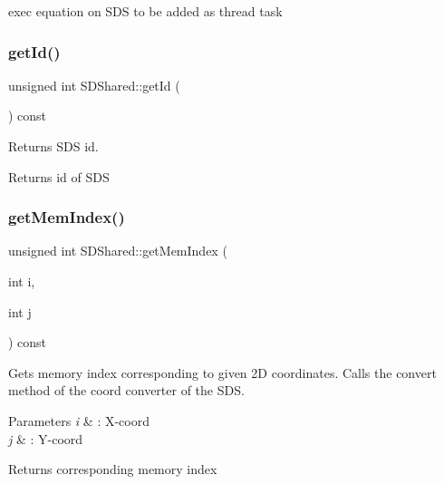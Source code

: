 exec equation on S\+DS to be added as thread task \mbox{\label{classSDShared_ab3a51f6ef83b411b8839a7953af5257d}} 
\subsubsection{\texorpdfstring{get\+Id()}{getId()}}
{\footnotesize\ttfamily unsigned int S\+D\+Shared\+::get\+Id (\begin{DoxyParamCaption}{ }\end{DoxyParamCaption}) const}



Returns S\+DS id. 

\begin{DoxyReturn}{Returns}
id of S\+DS 
\end{DoxyReturn}
\mbox{\label{classSDShared_a2418c837fb19a0997ca61e4b8bd65597}} 
\subsubsection{\texorpdfstring{get\+Mem\+Index()}{getMemIndex()}\hspace{0.1cm}{\footnotesize\ttfamily [1/2]}}
{\footnotesize\ttfamily unsigned int S\+D\+Shared\+::get\+Mem\+Index (\begin{DoxyParamCaption}\item[{int}]{i,  }\item[{int}]{j }\end{DoxyParamCaption}) const}



Gets memory index corresponding to given 2D coordinates. Calls the convert method of the coord converter of the S\+DS. 


\begin{DoxyParams}{Parameters}
{\em i} & \+: X-\/coord \\
\hline
{\em j} & \+: Y-\/coord\\
\hline
\end{DoxyParams}
\begin{DoxyReturn}{Returns}
corresponding memory index 
\end{DoxyReturn}
\mbox{\label{classSDShared_a2418c837fb19a0997ca61e4b8bd65597}} 
